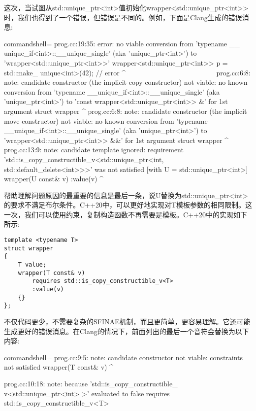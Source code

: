 这次，当试图从std::unique\_ptr<int>值初始化wrapper<std::unique\_ptr<int>{}>时，我们也得到了一个错误，但错误是不同的。例如，下面是Clang生成的错误消息:

\begin{tcblisting}{commandshell={}}
prog.cc:19:35: error: no viable conversion from 'typename __
unique_if<int>::__unique_single' (aka 'unique_ptr<int>') to
   'wrapper<std::unique_ptr<int>>'
wrapper<std::unique_ptr<int>> p = std::make_
unique<int>(42); // error
                                        ^ ~~~~~~~~~~~~~~~~~~~~~~~~~
prog.cc:6:8: note: candidate constructor (the implicit copy
constructor) not viable: no known conversion from 'typename
__unique_if<int>::__unique_single' (aka 'unique_ptr<int>') to
'const wrapper<std::unique_ptr<int>> &' for 1st argument
struct wrapper
         ^
prog.cc:6:8: note: candidate constructor (the implicit move
constructor) not viable: no known conversion from 'typename
__unique_if<int>::__unique_single' (aka 'unique_ptr<int>') to
'wrapper<std::unique_ptr<int>> &&' for 1st argument
struct wrapper
         ^
prog.cc:13:9: note: candidate template ignored: requirement
'std::is_copy_constructible_v<std::unique_ptr<int,
std::default_delete<int>>>' was not satisfied [with U =
std::unique_ptr<int>]
        wrapper(U const& v) :value(v) {}
        ^
\end{tcblisting}

帮助理解问题原因的最重要的信息是最后一条，说U替换为std::unique\_ptr<int>的要求不满足布尔条件。C++20中，可以更好地实现对T模板参数的相同限制。这一次，我们可以使用约束，复制构造函数不再需要是模板。C++20中的实现如下所示:

\begin{lstlisting}[style=styleCXX]
template <typename T>
struct wrapper
{
	T value;
	wrapper(T const& v)
		requires std::is_copy_constructible_v<T>
		:value(v)
	{}
};
\end{lstlisting}

不仅代码更少，不需要复杂的SFINAE机制，而且更简单，更容易理解。它还可能生成更好的错误消息。在Clang的情况下，前面列出的最后一个音符会替换为以下内容:

\begin{tcblisting}{commandshell={}}
prog.cc:9:5: note: candidate constructor not viable:
constraints not satisfied
    wrapper(T const& v)
    ^

prog.cc:10:18: note: because 'std::is_copy_constructible_
v<std::unique_ptr<int> >' evaluated to false
        requires std::is_copy_constructible_v<T>
\end{tcblisting}

